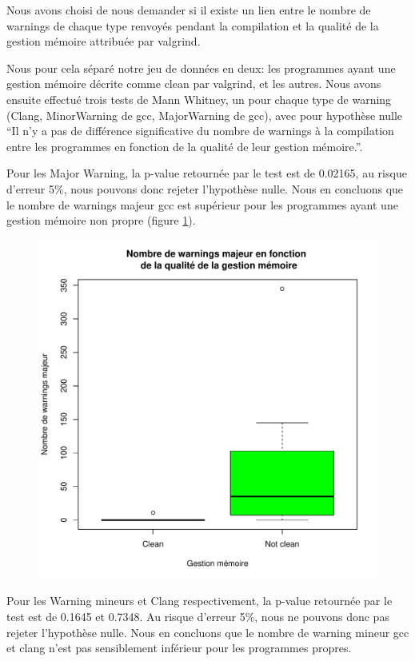 Nous avons choisi de nous demander si il existe un lien entre le
nombre de warnings de chaque type renvoyés pendant la compilation et la
qualité de la gestion mémoire attribuée par valgrind.

Nous pour cela séparé notre jeu de données en deux: les programmes
ayant une gestion mémoire décrite comme clean par valgrind, et les
autres.
Nous avons ensuite effectué trois tests de Mann Whitney, un pour chaque
type de warning (Clang, MinorWarning de gcc, MajorWarning de gcc),
avec pour hypothèse nulle ``Il n'y a pas de différence significative
du nombre de warnings à la compilation entre les programmes en fonction
de la qualité de leur gestion mémoire.''.

Pour les Major Warning, la p-value retournée par le test est de
0.02165, au risque d'erreur 5\%, nous pouvons donc rejeter
l'hypothèse nulle. Nous en concluons que le nombre de warnings majeur gcc
est supérieur pour les programmes ayant une gestion mémoire non propre
(figure \ref{fig:MW_valgr}).

\begin{figure}[h]
  \centering
  \includegraphics[width=.48\textwidth]{figures/MW_valgr.pdf}
  \caption{}\label{fig:MW_valgr}
\end{figure}

Pour les Warning mineurs et Clang respectivement, la p-value retournée
par le test est de 0.1645 et 0.7348. Au risque d'erreur 5\%, nous ne
pouvons donc pas rejeter l'hypothèse nulle. Nous en concluons que le
nombre de warning mineur gcc et clang n'est pas sensiblement inférieur
pour les programmes propres.
